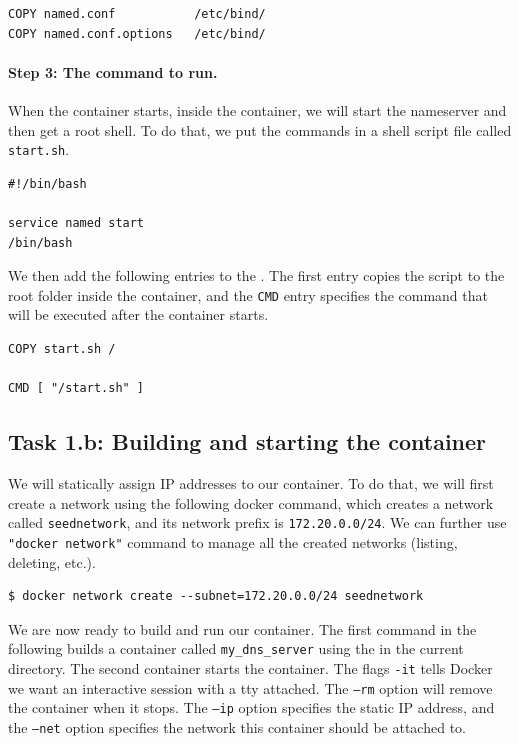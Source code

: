 \begin{lstlisting}
COPY named.conf           /etc/bind/
COPY named.conf.options   /etc/bind/
\end{lstlisting}
 


\paragraph{Step 3: The command to run.} 
When the container starts, inside the container, we will start the nameserver 
and then get a root shell. To do that, we put the commands in a shell script 
file called \texttt{start.sh}.  

\begin{lstlisting}
#!/bin/bash

service named start
/bin/bash
\end{lstlisting}
 

We then add the following entries to the \dockerfile. The first entry
copies the script to the root folder inside the container, 
and the \texttt{CMD} entry specifies the 
command that will be executed after the container starts. 

\begin{lstlisting}
COPY start.sh /

CMD [ "/start.sh" ]
\end{lstlisting}



\subsection{Task 1.b: Building and starting the container}
 

We will statically assign IP addresses to our container. To do that,
we will first create a network using the following 
docker command, which creates a network called \texttt{seednetwork},
and its network prefix is \texttt{172.20.0.0/24}.  
We can further use \texttt{"docker network"} command to manage
all the created networks (listing, deleting, etc.).

\begin{lstlisting}
$ docker network create --subnet=172.20.0.0/24 seednetwork
\end{lstlisting}



We are now ready to build and run our container. The first command 
in the following builds a container called \texttt{my\_dns\_server} using
the \dockerfile in the current directory. 
The second container starts the container. 
The flags \texttt{-it} tells Docker we want an interactive session 
with a tty attached. The \texttt{--rm} option will remove the container 
when it stops. The \texttt{--ip} option specifies the static 
IP address, and the \texttt{--net} option specifies 
the network this container should be attached to.


